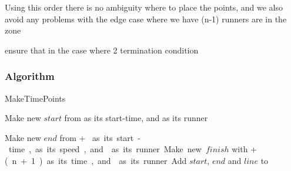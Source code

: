 Using this order there is no ambiguity where to place the points, and we also avoid any problems with the edge case where we have (n-1) runners are in the zone 


ensure that in the case where 2 
 termination condition 

\subsubsection{Algorithm}
\begin{algorithm}[H]
\caption{MakeTimePoints}
\highlights
{}
 
Make new \startT $start$ from \start as its start-time, and \run as its runner 
  
Make new \eT $end$ from \start + \unit * \n as its start-time, \unit as its speed, and \run as its runner
  
Make new \finish $finish$ with \start + \unit * (n+1) as its time, and \run as its runner
  
Add $start$, $end$ and $line$ to \li

\return \li
\end{algorithm}

